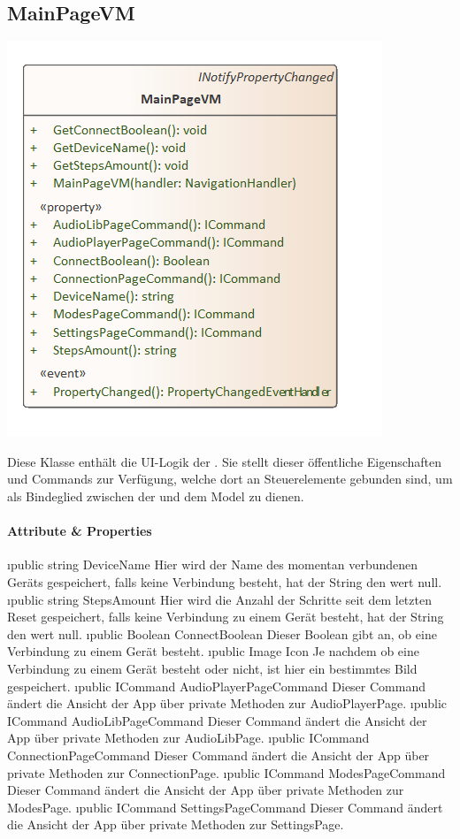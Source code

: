 \documentclass[../entwurf.tex]{subfiles}
\begin{document}
\subsection{MainPageVM}
\begin{minipage}{0.5\textwidth}
\includegraphics[scale=0.75]{../graphics/vm_klassen/MainPageVM.png}
\end{minipage}
\begin{minipage}{0.5\textwidth}
Diese Klasse enthält die UI-Logik der . Sie stellt dieser öffentliche Eigenschaften und Commands zur Verfügung, welche dort an Steuerelemente gebunden sind, um als Bindeglied zwischen der  und dem Model zu dienen.
\end{minipage}
\paragraph{Attribute \& Properties}
\begin{itemize}
	\i{public string DeviceName} Hier wird der Name des momentan verbundenen Geräts gespeichert, falls keine Verbindung besteht, hat der String den wert null.
	\i{public string StepsAmount} Hier wird die Anzahl der Schritte seit dem letzten Reset gespeichert, falls keine Verbindung zu einem Gerät besteht, hat der String den wert null.
	\i{public Boolean ConnectBoolean} Dieser Boolean gibt an, ob eine Verbindung zu einem Gerät besteht.
	\i{public Image Icon} Je nachdem ob eine Verbindung zu einem Gerät besteht oder nicht, ist hier ein bestimmtes Bild gespeichert.
	\i{public ICommand AudioPlayerPageCommand} Dieser Command ändert die Ansicht der App über private Methoden zur AudioPlayerPage. 
	\i{public ICommand AudioLibPageCommand} Dieser Command ändert die Ansicht der App über private Methoden zur AudioLibPage. 
	\i{public ICommand ConnectionPageCommand} Dieser Command ändert die Ansicht der App über private Methoden zur ConnectionPage. 
	\i{public ICommand ModesPageCommand} Dieser Command ändert die Ansicht der App über private Methoden zur ModesPage. 
	\i{public ICommand SettingsPageCommand} Dieser Command ändert die Ansicht der App über private Methoden zur SettingsPage. 
\end{itemize}
\end{document}

